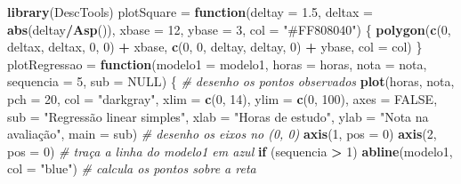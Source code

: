 \documentclass[
]{book}
\newenvironment{Shaded}{\begin{snugshade}}{\end{snugshade}}
\newcommand{\AttributeTok}[1]{\textcolor[rgb]{0.13,0.29,0.53}{#1}}
\newcommand{\CommentTok}[1]{\textcolor[rgb]{0.56,0.35,0.01}{\textit{#1}}}
\newcommand{\ConstantTok}[1]{\textcolor[rgb]{0.56,0.35,0.01}{#1}}
\newcommand{\ControlFlowTok}[1]{\textcolor[rgb]{0.13,0.29,0.53}{\textbf{#1}}}
\newcommand{\DecValTok}[1]{\textcolor[rgb]{0.00,0.00,0.81}{#1}}
\newcommand{\FloatTok}[1]{\textcolor[rgb]{0.00,0.00,0.81}{#1}}
\newcommand{\FunctionTok}[1]{\textcolor[rgb]{0.13,0.29,0.53}{\textbf{#1}}}
\newcommand{\NormalTok}[1]{#1}
\newcommand{\OtherTok}[1]{\textcolor[rgb]{0.56,0.35,0.01}{#1}}
\newcommand{\SpecialCharTok}[1]{\textcolor[rgb]{0.81,0.36,0.00}{\textbf{#1}}}
\newcommand{\StringTok}[1]{\textcolor[rgb]{0.31,0.60,0.02}{#1}}
\begin{document}
\begin{Shaded}
\begin{Highlighting}[]
\FunctionTok{library}\NormalTok{(DescTools)}
\NormalTok{plotSquare }\OtherTok{=} \ControlFlowTok{function}\NormalTok{(}\AttributeTok{deltay =} \FloatTok{1.5}\NormalTok{, }\AttributeTok{deltax =} \FunctionTok{abs}\NormalTok{(deltay}\SpecialCharTok{/}\FunctionTok{Asp}\NormalTok{()),}
    \AttributeTok{xbase =} \DecValTok{12}\NormalTok{, }\AttributeTok{ybase =} \DecValTok{3}\NormalTok{, }\AttributeTok{col =} \StringTok{"\#FF808040"}\NormalTok{) \{}
    \FunctionTok{polygon}\NormalTok{(}\FunctionTok{c}\NormalTok{(}\DecValTok{0}\NormalTok{, deltax, deltax, }\DecValTok{0}\NormalTok{, }\DecValTok{0}\NormalTok{) }\SpecialCharTok{+}\NormalTok{ xbase, }\FunctionTok{c}\NormalTok{(}\DecValTok{0}\NormalTok{, }\DecValTok{0}\NormalTok{, deltay,}
\NormalTok{        deltay, }\DecValTok{0}\NormalTok{) }\SpecialCharTok{+}\NormalTok{ ybase, }\AttributeTok{col =}\NormalTok{ col)}
\NormalTok{\}}
\NormalTok{plotRegressao }\OtherTok{=} \ControlFlowTok{function}\NormalTok{(}\AttributeTok{modelo1 =}\NormalTok{ modelo1, }\AttributeTok{horas =}\NormalTok{ horas, }\AttributeTok{nota =}\NormalTok{ nota,}
    \AttributeTok{sequencia =} \DecValTok{5}\NormalTok{, }\AttributeTok{sub =} \ConstantTok{NULL}\NormalTok{) \{}
    \CommentTok{\# desenho os pontos observados}
    \FunctionTok{plot}\NormalTok{(horas, nota, }\AttributeTok{pch =} \DecValTok{20}\NormalTok{, }\AttributeTok{col =} \StringTok{"darkgray"}\NormalTok{, }\AttributeTok{xlim =} \FunctionTok{c}\NormalTok{(}\DecValTok{0}\NormalTok{,}
        \DecValTok{14}\NormalTok{), }\AttributeTok{ylim =} \FunctionTok{c}\NormalTok{(}\DecValTok{0}\NormalTok{, }\DecValTok{100}\NormalTok{), }\AttributeTok{axes =} \ConstantTok{FALSE}\NormalTok{, }\AttributeTok{sub =} \StringTok{"Regressão linear simples"}\NormalTok{,}
        \AttributeTok{xlab =} \StringTok{"Horas de estudo"}\NormalTok{, }\AttributeTok{ylab =} \StringTok{"Nota na avaliação"}\NormalTok{,}
        \AttributeTok{main =}\NormalTok{ sub)}
    \CommentTok{\# desenho os eixos no (0, 0)}
    \FunctionTok{axis}\NormalTok{(}\DecValTok{1}\NormalTok{, }\AttributeTok{pos =} \DecValTok{0}\NormalTok{)}
    \FunctionTok{axis}\NormalTok{(}\DecValTok{2}\NormalTok{, }\AttributeTok{pos =} \DecValTok{0}\NormalTok{)}
    \CommentTok{\# traça a linha do modelo1 em azul}
    \ControlFlowTok{if}\NormalTok{ (sequencia }\SpecialCharTok{\textgreater{}} \DecValTok{1}\NormalTok{)}
        \FunctionTok{abline}\NormalTok{(modelo1, }\AttributeTok{col =} \StringTok{"blue"}\NormalTok{)}
    \CommentTok{\# calcula os pontos sobre a reta}

\end{Highlighting}
\end{Shaded}
\end{document}
